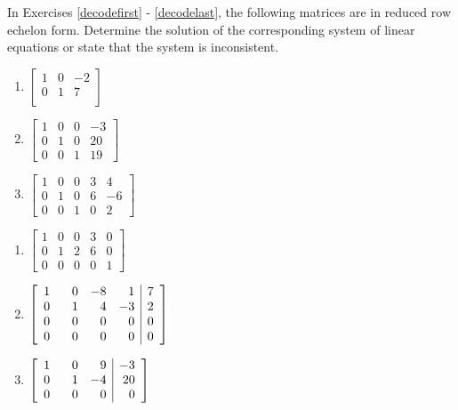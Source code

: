 In Exercises \ref{decodefirst} - \ref{decodelast}, the following matrices are in reduced row echelon form.  Determine the solution of the corresponding system of linear equations or state that the system is inconsistent.  


\begin{multicols}{3}
\begin{enumerate}
\setcounter{enumi}{\value{HW}}

\item $\left[ \begin{array}{rr|r} 
1 & 0 & -2 \\ 
0 & 1 & 7  \\ 
\end{array} \right]$  \label{decodefirst}

\item $\left[ \begin{array}{rrr|r} 
1 & 0 & 0 & -3 \\ 
0 & 1 & 0 & 20 \\ 
0 & 0 & 1 & 19  
\end{array} \right]$

\item $\left[ \begin{array}{rrrr|r} 
1 & 0 & 0 & 3 & 4 \\ 
0 & 1 & 0 & 6 & -6 \\ 
0 & 0 & 1 & 0 & 2 
\end{array} \right]$

\setcounter{HW}{\value{enumi}}
\end{enumerate}
\end{multicols}

\begin{multicols}{3}
\begin{enumerate}
\setcounter{enumi}{\value{HW}}

\item $\left[ \begin{array}{rrrr|r} 
1 & 0 & 0 & 3 & 0 \\ 
0 & 1 & 2 & 6 & 0 \\ 
0 & 0 & 0 & 0 & 1 
\end{array} \right]$

\item $\left[ \begin{array}{rrrr|r} 
1 & \hphantom{-}0 & -8 & 1 & 7 \\ 
0 & 1 & 4 & -3 & 2 \\ 
0 & 0 & 0 & 0 & 0 \\
0 & 0 & 0 & 0 & 0 
\end{array} \right]$

\item $\left[ \begin{array}{rrr|r} 
1 & \hphantom{-}0 & 9 & -3 \\ 
0 & 1 & -4 & 20 \\ 
0 & 0 & 0 & 0  
\end{array} \right]$ \label{decodelast}

\setcounter{HW}{\value{enumi}}
\end{enumerate}
\end{multicols}




